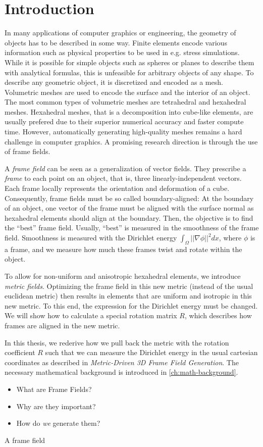 \documentclass[../thesis.tex]{subfiles}
\begin{document}
\chapter{Introduction}
\label{ch:intro}
In many applications of computer graphics or engineering, the geometry of objects
has to be described in some way. Finite elements encode various information such as physical properties
to be used in e.g. stress simulations.
While it is possible for simple objects such as spheres or planes to describe them
with analytical formulas, this is unfeasible for arbitrary objects of any shape.
To describe any geometric object, it is discretized and encoded as a mesh.
Volumetric meshes are used to encode the surface and the interior of an object.
The most common types of volumetric meshes are tetrahedral and hexahedral meshes.
Hexahedral meshes, that is a decomposition into cube-like elements,
are usually prefered due to their superior numerical accuracy and faster compute time.
However, automatically generating high-quality meshes remains a hard challenge
in computer graphics.
A promising research direction is through the use of frame fields.

A \emph{frame field} can be seen as a generalization of vector fields.
They prescribe a \emph{frame} to each point on an object, that is, three linearly-independent
vectors. Each frame locally represents the orientation and deformation of a cube.
Consequently, frame fields must be so called boundary-aligned:
At the boundary of an object, one vector of the frame must be aligned with the surface normal
as hexahedral elements should align at the boundary.
Then, the objective is to find the ``best'' frame field.
Usually, ``best'' is measured in the smoothness of the frame field.
Smoothness is measured with the Dirichlet energy $\int_{\Omega}||\nabla \phi||^2dx$,
where $\phi$ is a frame, and we measure how much these frames twist and rotate within the object.

To allow for non-uniform and anisotropic hexahedral elements, we introduce
\emph{metric fields}. Optimizing the frame field in this new metric (instead of the usual euclidean metric) then results
in elements that are uniform and isotropic in this new metric.
To this end, the expression for the Dirichlet energy must be changed.
We will show how to calculate a special rotation matrix $R$, which describes
how frames are aligned in the new metric.


In this thesis, we rederive how we pull back the metric with the rotation coefficient $R$ such that we can measure
the Dirichlet energy in the usual cartesian coordinates as described in \emph{Metric-Driven 3D Frame Field Generation}\cite{Fang23}.
The necessary mathematical background is introduced in \ref{ch:math-background}.






\begin{itemize}
  \item What are Frame Fields?
  \item Why are they important?
  \item How do \emph{we} generate them?
\end{itemize}
A frame field 
\end{document}
